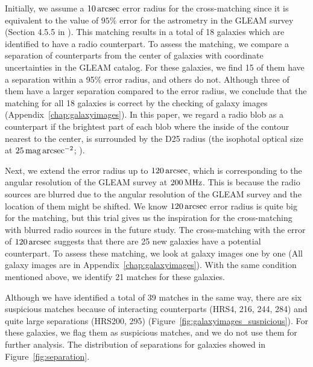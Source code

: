 Initially, we assume a $10\,\mathrm{arcsec}$ error radius for the cross-matching since it is equivalent to the value of $95\%$ error for the astrometry in the GLEAM survey (Section 4.5.5 in \citealt{Hurley-Walker2017a}).
This matching results in a total of 18 galaxies which are identified to have a radio counterpart.
To assess the matching, we compare a separation of counterparts from the center of galaxies with coordinate uncertainties in the GLEAM catalog.
For these galaxies, we find 15 of them have a separation within a 95\% error radius, and others do not.
Although three of them have a larger separation compared to the error radius, we conclude that the matching for all 18 galaxies is correct by the checking of galaxy images (Appendix~\ref{chap:galaxyimages}).
In this paper, we regard a radio blob as a counterpart if the brightest part of each blob where the inside of the contour nearest to the center, is surrounded by the D25 radius (the isophotal optical size at $25\,\mathrm{mag}\,\mathrm{arcsec}^{-2}$; \citealt{Boselli2010}).

Next, we extend the error radius up to $120\,\mathrm{arcsec}$, which is corresponding to the angular resolution of the GLEAM survey at $200\,\mathrm{MHz}$.
This is because the radio sources are blurred due to the angular resolution of the GLEAM survey and the location of them might be shifted.
We know $120\,\mathrm{arcsec}$ error radius is quite big for the matching, but this trial gives us the inspiration for the cross-matching with blurred radio sources in the future study.
The cross-matching with the error of $120\,\mathrm{arcsec}$ suggests that there are 25 new galaxies have a potential counterpart.
To assess these matching, we look at galaxy images one by one (All galaxy images are in Appendix~\ref{chap:galaxyimages}).
With the same condition mentioned above, we identify 21 matches for these galaxies.

Although we have identified a total of 39 matches in the same way, there are six suspicious matches because of interacting counterparts (HRS4, 216, 244, 284) and quite large separations (HRS200, 295) (Figure~\ref{fig:galaxyimages_suspicious}).
For these galaxies, we flag them as suspicious matches, and we do not use them for further analysis.
The distribution of separations for galaxies showed in Figure~\ref{fig:separation}.

